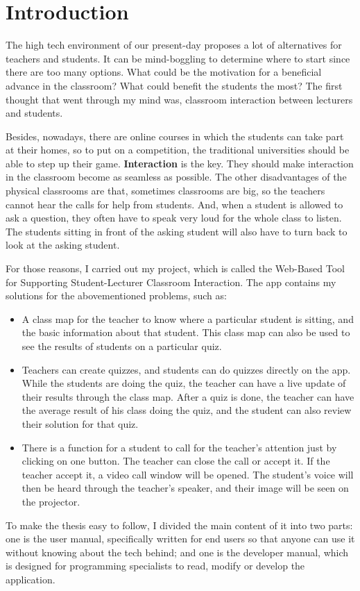 \documentclass[a4paper, 11pt,openany]{book} %
\begin{document}
\chapter{Introduction}
The high tech environment of our present-day proposes a lot of alternatives for teachers and students. It can be mind-boggling to determine where to start since there are too many options. What could be the motivation for a beneficial advance in the classroom? What could benefit the students the most? The first thought that went through my mind was, classroom interaction between lecturers and students.\par 
Besides, nowadays, there are online courses in which the students can take part at their homes, so to put on a competition, the traditional universities should be able to step up their game. \textbf{Interaction} is the key. They should make interaction in the classroom become as seamless as possible. The other disadvantages of the physical classrooms are that, sometimes classrooms are big, so the teachers cannot hear the calls for help from students. And, when a student is allowed to ask a question, they often have to speak very loud for the whole class to listen. The students sitting in front of the asking student will also have to turn back to look at the asking student. \par 
For those reasons, I carried out my project, which is called the Web-Based Tool for Supporting Student-Lecturer Classroom Interaction. The app contains my solutions for the abovementioned problems, such as:
\begin{itemize}
    \item A class map for the teacher to know where a particular student is sitting, and the basic information about that student. This class map can also be used to see the results of students on a particular quiz.
    \item Teachers can create quizzes, and students can do quizzes directly on the app. While the students are doing the quiz, the teacher can have a live update of their results through the class map. After a quiz is done, the teacher can have the average result of his class doing the quiz, and the student can also review their solution for that quiz. 
    \item There is a function for a student to call for the teacher's attention just by clicking on one button. The teacher can close the call or accept it. If the teacher accept it, a video call window will be opened. The student's voice will then be heard through the teacher's speaker, and their image will be seen on the projector.
\end{itemize}
To make the thesis easy to follow, I divided the main content of it into two parts: one is the user manual, specifically written for end users so that anyone can use it without knowing about the tech behind; and one is the developer manual, which is designed for programming specialists to read, modify or develop the application. 
\end{document}
